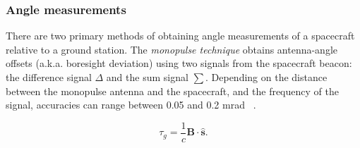 \subsubsection{Angle measurements}

There are two primary methods of obtaining angle measurements of a spacecraft
relative to a ground station. The \textit{monopulse technique} obtains
antenna-angle offsets (a.k.a. boresight deviation) using two signals from the
spacecraft beacon: the difference signal $\Delta$ and the sum signal $\sum$.
Depending on the distance between the monopulse antenna and the spacecraft, and
the frequency of the signal, accuracies can range between 0.05 and 0.2 mrad
~\cite[p.~196]{Montenbruck2000}.

\begin{equation}
    \tau_g=\frac{1}{c}\bm{B}\cdot{\hat{\bm{s}}}.
    \label{eq:vlbi-vector}
\end{equation}


